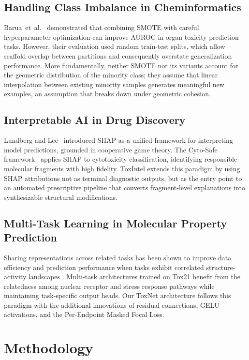 \documentclass[lettersize,journal]{IEEEtran}
\begin{document}
\subsection{Handling Class Imbalance in Cheminformatics}
Barua~et~al.~\cite{barua} demonstrated that combining SMOTE with careful
hyperparameter optimization can improve AUROC in organ toxicity prediction tasks.
However, their evaluation used random train-test splits, which allow scaffold
overlap between partitions and consequently overstate generalization performance.
More fundamentally, neither SMOTE nor its variants account for the geometric
distribution of the minority class; they assume that linear interpolation
between existing minority samples generates meaningful new examples,
an assumption that breaks down under geometric cohesion.

\subsection{Interpretable AI in Drug Discovery}
Lundberg and Lee~\cite{lundberg2017} introduced SHAP as a unified framework for
interpreting model predictions, grounded in cooperative game theory.
The Cyto-Safe framework~\cite{feitosa} applies SHAP to cytotoxicity classification,
identifying responsible molecular fragments with high fidelity.
ToxIntel extends this paradigm by using SHAP attributions not as terminal
diagnostic outputs, but as the entry point to an automated prescriptive pipeline
that converts fragment-level explanations into synthesizable structural
modifications.

\subsection{Multi-Task Learning in Molecular Property Prediction}
Sharing representations across related tasks has been shown to improve data
efficiency and prediction performance when tasks exhibit correlated structure-activity
landscapes \cite{zhang2025}.
Multi-task architectures trained on Tox21 benefit from the relatedness among
nuclear receptor and stress response pathways while maintaining task-specific
output heads.
Our ToxNet architecture follows this paradigm with the additional innovations of
residual connections, GELU activations, and the Per-Endpoint Masked Focal Loss.

\section{Methodology}
\end{document}
